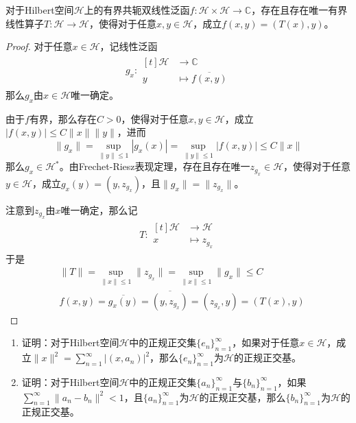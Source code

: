 \documentclass[lang = cn, scheme = chinese, 10pt]{elegantbook}
\newcommand{\C}{\mathbb{C}}  %
\begin{document}
\begin{proposition}
	对于Hilbert空间$\mathcal{H}$上的有界共轭双线性泛函$f:\mathcal{H}\times \mathcal{H}\to\C$，存在且存在唯一有界线性算子$T:\mathcal{H}\to\mathcal{H}$，使得对于任意$x,y\in \mathcal{H}$，成立$f(x,y)=(T(x),y)$。
\end{proposition}

\begin{proof}
	对于任意$x\in \mathcal{H}$，记线性泛函
	\nonumber\begin{align}
		g_x:\begin{aligned}[t]
			\mathcal{H}&\longrightarrow\C\\
			y&\longmapsto \overline{f(x,y)}
		\end{aligned}
	\end{align}
	那么$g_x$由$x\in\mathcal{H}$唯一确定。
	
	由于$f$有界，那么存在$C>0$，使得对于任意$x,y\in\mathcal{H}$，成立$|f(x,y)|\le C\|x\|\|y\|$，进而
	$$
	\|g_x\|=\sup_{\|y\|\le 1}|g_x(x)|=\sup_{\|y\|\le 1}|f(x,y)|\le C\|x\|
	$$
	那么$g_x\in\mathcal{H}^*$。由Frechet-Riesz表现定理，存在且存在唯一$z_{g_x}\in\mathcal{H}$，使得对于任意$y\in\mathcal{H}$，成立$g_x(y)=(y,z_{g_x})$，且$\|g_x\|=\|z_{g_x}\|$。
	
	注意到$z_{g_x}$由$x$唯一确定，那么记
	\nonumber\begin{align}
		T:\begin{aligned}[t]
			\mathcal{H}&\longrightarrow\mathcal{H}\\
			x&\longmapsto z_{g_x}
		\end{aligned}
	\end{align}
	于是
	\nonumber\begin{align}
		& \|T\|=\sup_{\|x\|\le 1}\|z_{g_x}\|=\sup_{\|x\|\le 1}\|g_x\|\le C\\
		&f(x,y)=\overline{g_x(y)}=\overline{(y,z_{g_x})}=(z_{g_x},y)=(T(x),y)
	\end{align}
\end{proof}

\begin{proposition}
	\begin{enumerate}
		\item 证明：对于Hilbert空间$\mathcal{H}$中的正规正交集$\{ e_n \}_{n=1}^{\infty}$，如果对于任意$x\in\mathcal{H}$，成立$\displaystyle \|x\|^2=\sum_{n=1}^{\infty}|(x,a_n)|^2$，那么$\{ e_n \}_{n=1}^{\infty}$为$\mathcal{H}$的正规正交基。
		\item 证明：对于Hilbert空间$\mathcal{H}$中的正规正交集$\{ a_n \}_{n=1}^{\infty}$与$\{ b_n \}_{n=1}^{\infty}$，如果$\displaystyle \sum_{n=1}^{\infty}\|a_n-b_n\|^2<1$，且$\{ a_n \}_{n=1}^{\infty}$为$\mathcal{H}$的正规正交基，那么$\{ b_n \}_{n=1}^{\infty}$为$\mathcal{H}$的正规正交基。
	\end{enumerate}
\end{proposition}
\end{document}
